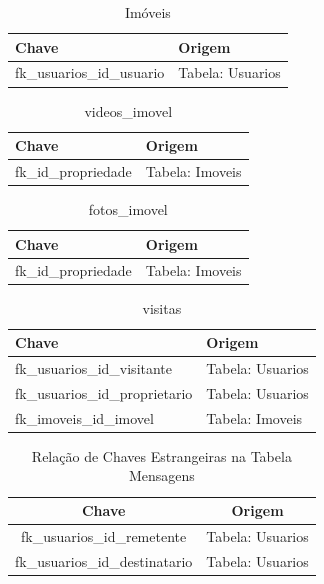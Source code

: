 \begin{table}[htbp]
    \centering
    \caption{Imóveis}
    \begin{tabular}{|p{8cm}|p{7cm}|} 
        \hline
        Chave & Origem\\
        \hline
        fk\_usuarios\_id\_usuario & Tabela: Usuarios\\
        \hline
    \end{tabular}
    \label{tab:Imoveis}
\end{table}

\begin{table}[htbp]
    \centering
    \caption{videos\_imovel}
    \begin{tabular}{|p{8cm}|p{7cm}|} 
        \hline
        Chave & Origem\\
        \hline
        fk\_id\_propriedade & Tabela: Imoveis\\
        \hline
    \end{tabular}
    \label{tab:Imoveis}
\end{table}

\begin{table}[htbp]
    \centering
    \caption{fotos\_imovel}
    \begin{tabular}{|p{8cm}|p{7cm}|} 
        \hline
        Chave & Origem\\
        \hline
        fk\_id\_propriedade & Tabela: Imoveis\\
        \hline
    \end{tabular}
    \label{tab:Imoveis}
\end{table}

\begin{table}[htbp]
    \centering
    \caption{visitas}
    \begin{tabular}{|p{8cm}|p{7cm}|} 
        \hline
        Chave & Origem\\
        \hline
        fk\_usuarios\_id\_visitante & Tabela: Usuarios\\
        \hline
        fk\_usuarios\_id\_proprietario & Tabela: Usuarios\\
        \hline
        fk\_imoveis\_id\_imovel & Tabela: Imoveis\\
        \hline
    \end{tabular}
    \label{tab:Imoveis}
\end{table}

\begin{table}[H]
	\centering
	\caption{Relação de Chaves Estrangeiras na Tabela Mensagens}
	\begin{tabular}{|c|c|} 
		\hline
		\textbf{Chave} & \textbf{Origem} \\
		\hline
		fk\_usuarios\_id\_remetente & Tabela: Usuarios \\
		\hline
		fk\_usuarios\_id\_destinatario & Tabela: Usuarios \\
		\hline
	\end{tabular}
	\label{tab:Mensagens}
\end{table}




